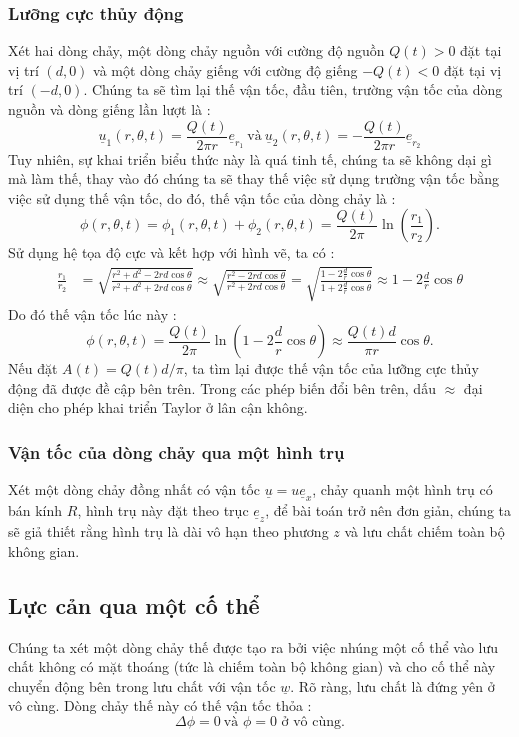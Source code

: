 \documentclass[CO_LUU_CHAT.tex]{subfiles}
\begin{document}
\subsubsection{Lưỡng cực thủy động}
Xét hai dòng chảy, một dòng chảy nguồn với cường độ nguồn $Q(t)>0$ đặt tại vị trí $(d,0)$ và một dòng chảy giếng với cường độ giếng $-Q(t)<0$ đặt tại vị trí $(-d,0)$. Chúng ta sẽ tìm lại thế vận tốc, đầu tiên, trường vận tốc của dòng nguồn và dòng giếng lần lượt là :
$$
\underline{u}_1(r,\theta,t)=\frac{Q(t)}{2\pi r}\underline{e}_{r_1}\ \text{và}\ \underline{u}_2(r,\theta,t)=-\frac{Q(t)}{2\pi r}\underline{e}_{r_2}
$$
Tuy nhiên, sự khai triển biểu thức này là quá tinh tế, chúng ta sẽ không dại gì mà làm thế, thay vào đó chúng ta sẽ thay thế việc sử dụng trường vận tốc bằng việc sử dụng thế vận tốc, do đó, thế vận tốc của dòng chảy là :
$$
\phi(r,\theta,t)=\phi_1(r,\theta,t)+\phi_2(r,\theta,t)=\frac{Q(t)}{2\pi}\ln\left(\frac{r_1}{r_2}\right).
$$
Sử dụng hệ tọa độ cực và kết hợp với hình vẽ, ta có :
$$
\begin{aligned}
	\frac{r_1}{r_2} &= \sqrt {\frac{r^2+d^2-2rd\cos\theta}{r^2 + d^2 + 2rd\cos \theta }}\approx\sqrt{\frac{r^2 - 2rd\cos\theta}{r^2 + 2rd\cos \theta}}
	\displaystyle=\sqrt{\frac{1-2\frac{d}{r}\cos\theta}{1+2\frac{d}{r}\cos \theta }}\approx 1-2\frac{d}{r}\cos\theta
\end{aligned}
$$
Do đó thế vận tốc lúc này :
$$
\phi(r,\theta,t)=\frac{Q(t)}{2\pi}\ln\left(1-2\frac{d}{r}\cos\theta\right)\approx\frac{Q(t)d}{\pi r}\cos\theta.
$$
Nếu đặt $A(t)=Q(t)d/\pi$, ta tìm lại được thế vận tốc của lưỡng cực thủy động đã được đề cập bên trên. Trong các phép biến đổi bên trên, dấu $\approx$ đại diện cho phép khai triển Taylor ở lân cận không.
\subsubsection{Vận tốc của dòng chảy qua một hình trụ}
Xét một dòng chảy đồng nhất có vận tốc $\underline{u}=u\underline{e}_x$, chảy quanh một hình trụ có bán kính $R$, hình trụ này đặt theo trục $\underline{e}_z$, để bài toán trở nên đơn giản, chúng ta sẽ giả thiết rằng hình trụ là dài vô hạn theo phương $z$ và lưu chất chiếm toàn bộ không gian.



\subsection{Lực cản qua một cố thể}
Chúng ta xét một dòng chảy thế được tạo ra bởi việc nhúng một cố thể vào lưu chất không có mặt thoáng (tức là chiếm toàn bộ không gian) và cho cố thể này chuyển động bên trong lưu chất với vận tốc $\underline{w}$. Rõ ràng, lưu chất là đứng yên ở vô cùng. Dòng chảy thế này có thế vận tốc thỏa :
$$
\Delta\phi=0\ \text{và $\phi=0$ ở vô cùng.}
$$
\end{document}
